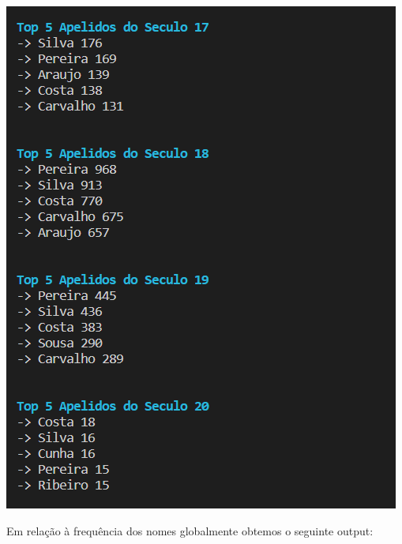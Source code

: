 \documentclass[11pt,a4paper]{report}
\begin{document}
\begin{center}
	\includegraphics[scale=0.7]{images/b2}
	\end{center}

\newpage
\qquad Em relação à frequência dos nomes globalmente obtemos o seguinte output: 
\end{document}
